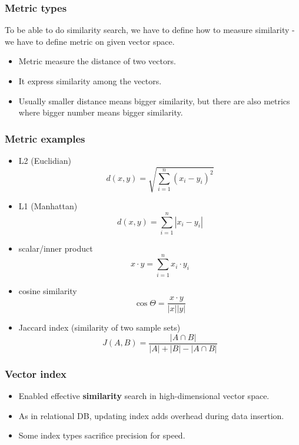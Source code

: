 \documentclass[10pt,utf8]{beamer}
\begin{document}
\begin{frame}
    \frametitle{Metric types}
    To be able to do similarity search, we have to define how to measure similarity - we have to define metric on given vector space.
    
    \vspace{0.1cm}
    
    \begin{itemize}
        \item Metric measure the distance of two vectors.
        \item It express similarity among the vectors.
        \item Usually smaller distance means bigger similarity, but there are also metrics where bigger number means bigger similarity.
    \end{itemize}
\end{frame}

\begin{frame}
    \frametitle{Metric examples}
    \begin{itemize}
        \item L2 (Euclidian) $$d(x,y) = \sqrt{\sum_{i=1}^{n} (x_i - y_i)^2}$$
        \item L1 (Manhattan) $$d(x,y) = \sum_{i=1}^{n} |x_i - y_i|$$
        \item scalar/inner product $$x \cdot y = \sum_{i=1}^{n} x_i \cdot y_i$$
        \item cosine similarity $$\cos{\Theta} = \frac{x \cdot y}{|x||y|}$$
        \item Jaccard index (similarity of two sample sets) $$J(A, B) = \frac{|A \cap B|}{|A| + |B| - |A \cap B|}$$
    \end{itemize}
\end{frame}

\begin{frame}
    \frametitle{Vector index}
    \begin{itemize}
        \item Enabled effective \textbf{similarity} search in high-dimensional vector space.
        \item As in relational DB, updating index adds overhead during data insertion.
        \item Some index types sacrifice precision for speed.
    \end{itemize}
\end{frame}
\end{document}
